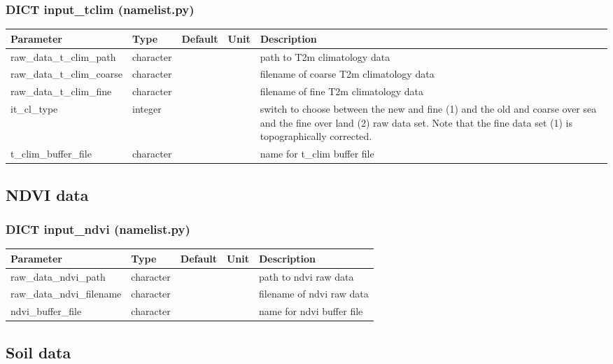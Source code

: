 \documentclass[a4paper,10pt,DIV14,BCOR1cm,titlepage,twoside]{scrartcl}
\providecommand{\tabularnewline}{\\}
\begin{document}
\subsubsection*{DICT input\_tclim (namelist.py)}

\begin{longtable}{|p{4cm}|p{1.5cm}|p{1.5cm}|p{1cm}|p{6cm}|}
\hline 
\textbf{Parameter}& \textbf{Type}& \textbf{Default}& \textbf{Unit}& \textbf{Description}
\tabularnewline
\hline
\endhead
\hline 
raw\_data\_t\_clim\_path & character & &  & path to T2m climatology data \tabularnewline
\hline 
raw\_data\_t\_clim\_coarse & character & &  & filename of coarse T2m climatology  data \tabularnewline
\hline
raw\_data\_t\_clim\_fine & character & &  & filename of fine T2m climatology  data \tabularnewline
\hline
it\_cl\_type & integer & & & switch to choose between the new and fine (1) and the old and coarse over sea and the fine over land (2) raw data set. 
Note that the fine data set (1) is topographically corrected.\tabularnewline
\hline
t\_clim\_buffer\_file & character & &  & name for t\_clim buffer file
\tabularnewline
\hline

\bottomrule
\end{longtable}

\subsection{NDVI data}\label{namelist_input_for_extpar_ndvi}

\subsubsection*{DICT input\_ndvi (namelist.py)}

\begin{longtable}{|p{4cm}|p{1.5cm}|p{1.5cm}|p{1cm}|p{6cm}|}
\hline 
\textbf{Parameter}& \textbf{Type}& \textbf{Default}& \textbf{Unit}& \textbf{Description}
\tabularnewline
\hline
\endhead
\hline 
raw\_data\_ndvi\_path & character & &  & path to ndvi raw data \tabularnewline
\hline 
raw\_data\_ndvi\_filename & character & &  & filename of ndvi raw data \tabularnewline
\hline
ndvi\_buffer\_file & character & &  & name for ndvi buffer file
\tabularnewline
\hline 
\bottomrule
\end{longtable}

\subsection{Soil data}\label{namelist_input_for_extpar_soil}
\end{document}
